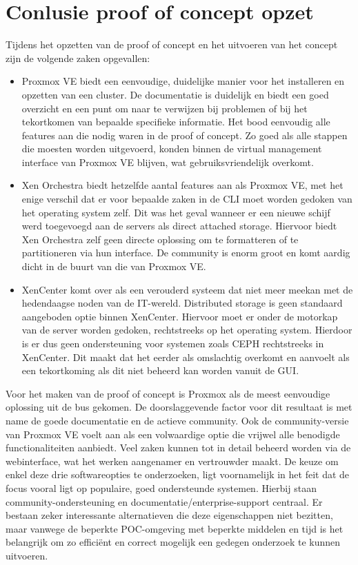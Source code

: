 \section{Conlusie proof of concept opzet}
Tijdens het opzetten van de proof of concept en het uitvoeren van het concept zijn de volgende zaken opgevallen:
\begin{itemize}
\item Proxmox VE biedt een eenvoudige, duidelijke manier voor het installeren en opzetten van een cluster. De documentatie is duidelijk en biedt een goed overzicht en een punt om naar te verwijzen bij problemen of bij het tekortkomen van bepaalde specifieke informatie. Het bood eenvoudig alle features aan die nodig waren in de proof of concept. Zo goed als alle stappen die moesten worden uitgevoerd, konden binnen de virtual management interface van Proxmox VE blijven, wat gebruiksvriendelijk overkomt.
\item Xen Orchestra biedt hetzelfde aantal features aan als Proxmox VE, met het enige verschil dat er voor bepaalde zaken in de CLI moet worden gedoken van het operating system zelf. Dit was het geval wanneer er een nieuwe schijf werd toegevoegd aan de servers als direct attached storage. Hiervoor biedt Xen Orchestra zelf geen directe oplossing om te formatteren of te partitioneren via hun interface. De community is enorm groot en komt aardig dicht in de buurt van die van Proxmox VE.
\item XenCenter komt over als een verouderd systeem dat niet meer meekan met de hedendaagse noden van de IT-wereld. Distributed storage is geen standaard aangeboden optie binnen XenCenter. Hiervoor moet er onder de motorkap van de server worden gedoken, rechtstreeks op het operating system. Hierdoor is er dus geen ondersteuning voor systemen zoals CEPH rechtstreeks in XenCenter. Dit maakt dat het eerder als omslachtig overkomt en aanvoelt als een tekortkoming als dit niet beheerd kan worden vanuit de GUI.
\end{itemize}
Voor het maken van de proof of concept is Proxmox als de meest eenvoudige oplossing uit de bus gekomen. De doorslaggevende factor voor dit resultaat is met name de goede documentatie en de actieve community. Ook de community-versie van Proxmox VE voelt aan als een volwaardige optie die vrijwel alle benodigde functionaliteiten aanbiedt. Veel zaken kunnen tot in detail beheerd worden via de webinterface, wat het werken aangenamer en vertrouwder maakt.
De keuze om enkel deze drie softwareopties te onderzoeken, ligt voornamelijk in het feit dat de focus vooral ligt op populaire, goed ondersteunde systemen. Hierbij staan community-ondersteuning en documentatie/enterprise-support centraal. Er bestaan zeker interessante alternatieven die deze eigenschappen niet bezitten, maar vanwege de beperkte POC-omgeving met beperkte middelen en tijd is het belangrijk om zo efficiënt en correct mogelijk een gedegen onderzoek te kunnen uitvoeren.